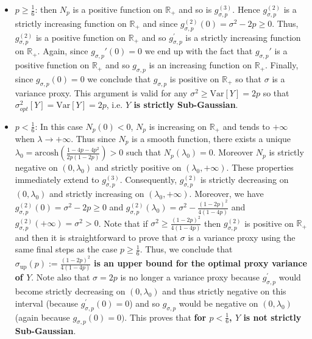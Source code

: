 \documentclass[a4paper, 10pt]{article}
\newcommand{\arcosh}{\text{arcosh}}
\theoremstyle{definition}
\begin{document}
\begin{itemize}
    \item $p\geq \frac{1}{6}$:  then $N_{p}$ is a positive function on $\mathbb{R}_+$ and so is $g^{(3)}_{\sigma,p}$. Hence $g_{\sigma,p}^{(2)}$ is a strictly increasing function on $\mathbb{R}_+$ and since $g^{(2)}_{\sigma,p}(0)=\sigma^2-2p\geq0$. Thus, $g^{(2)}_{\sigma,p}$ is a positive function on $\mathbb{R}_+$ and so $g^{'}_{\sigma,p}$ is a strictly increasing function on $\mathbb{R}_+$. Again, since $g_{\sigma,p}'(0)=0$ we end up with the fact that $g_{\sigma,p}'$ is a positive function on $\mathbb{R}_+$ and so $g_{\sigma,p}$ is an increasing function on $\mathbb{R}_+$. Finally, since $g_{\sigma,p}(0)=0$ we conclude that $g_{\sigma,p}$ is positive on $\mathbb{R}_+$ so that $\sigma$ is a variance proxy. This argument is valid for any $\sigma^2\geq \text{Var}[Y]=2p$ so that $\sigma^2_{opt}[Y]=\text{Var}[Y]=2p$, i.e. \textbf{$Y$ is strictly Sub-Gaussian}.
    \item $p<\frac{1}{6}$: In this case $N_{p}(0)<0$, $N_{p}$ is increasing on $\mathbb{R}_+$ and tends to $+\infty$ when $\lambda\to +\infty$. Thus since $N_{p}$ is a smooth function, there exists a unique $\lambda_0=\arcosh\left(\frac{1-4p-4p^2}{2p(1-2p)}\right)>0$ such that $N_{p}(\lambda_0)=0$. Moreover $N_{p}$ is strictly negative on $(0,\lambda_0)$ and strictly positive on $(\lambda_0,+\infty)$. These properties immediately extend to $g_{\sigma,p}^{(3)}$. Consequently, $g_{\sigma,p}^{(2)}$ is strictly decreasing on $(0,\lambda_0)$ and strictly increasing on $(\lambda_0,+\infty)$. Moreover, we have $g_{\sigma,p}^{(2)}(0)=\sigma^2-2p\geq 0$ and $g_{\sigma,p}^{(2)}(\lambda_0)=\sigma^2-\frac{(1-2p)^2}{4(1-4p)}$ and $g_{\sigma,p}^{(2)}(+\infty)=\sigma^2>0$. Note that if $\sigma^2\geq \frac{(1-2p)^2}{4(1-4p)}$ then $g^{(2)}_{\sigma,p}$ is positive on $\mathbb{R}_+$ and then it is straightforward to prove that $\sigma$ is a variance proxy using the same final steps as the case $p\geq\frac{1}{6}$. Thus, we conclude that $\sigma_{\text{up}}(p):=\frac{(1-2p)^2}{4(1-4p)}$ \textbf{is an upper bound for the optimal proxy variance of $Y$}. Note also that $\sigma=2p$ is no longer a variance proxy because $g^{'}_{\sigma,p}$ would become strictly decreasing on $(0,\lambda_0)$ and thus strictly negative on this interval (because $g^{'}_{\sigma,p}(0)=0$) and so $g_{\sigma,p}$ would be negative on $(0,\lambda_0)$ (again because $g_{\sigma,p}(0)=0)$. This proves that \textbf{for $p<\frac{1}{6}$, $Y$ is not strictly Sub-Gaussian}. 
\end{itemize}
\end{document}
